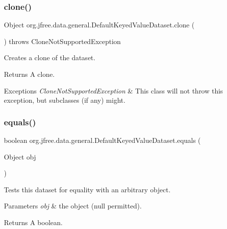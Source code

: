 \subsubsection{\texorpdfstring{clone()}{clone()}}
{\footnotesize\ttfamily Object org.\+jfree.\+data.\+general.\+Default\+Keyed\+Value\+Dataset.\+clone (\begin{DoxyParamCaption}{ }\end{DoxyParamCaption}) throws Clone\+Not\+Supported\+Exception}

Creates a clone of the dataset.

\begin{DoxyReturn}{Returns}
A clone.
\end{DoxyReturn}

\begin{DoxyExceptions}{Exceptions}
{\em Clone\+Not\+Supported\+Exception} & This class will not throw this exception, but subclasses (if any) might. \\
\hline
\end{DoxyExceptions}
\mbox{\label{classorg_1_1jfree_1_1data_1_1general_1_1_default_keyed_value_dataset_ac46f6c782c4bff5530f89decb8b70966}} 
\subsubsection{\texorpdfstring{equals()}{equals()}}
{\footnotesize\ttfamily boolean org.\+jfree.\+data.\+general.\+Default\+Keyed\+Value\+Dataset.\+equals (\begin{DoxyParamCaption}\item[{Object}]{obj }\end{DoxyParamCaption})}

Tests this dataset for equality with an arbitrary object.


\begin{DoxyParams}{Parameters}
{\em obj} & the object ({\ttfamily null} permitted).\\
\hline
\end{DoxyParams}
\begin{DoxyReturn}{Returns}
A boolean. 
\end{DoxyReturn}
\mbox{\label{classorg_1_1jfree_1_1data_1_1general_1_1_default_keyed_value_dataset_a295e1097c6ecf63b20cb1de7570aebd0}} 
